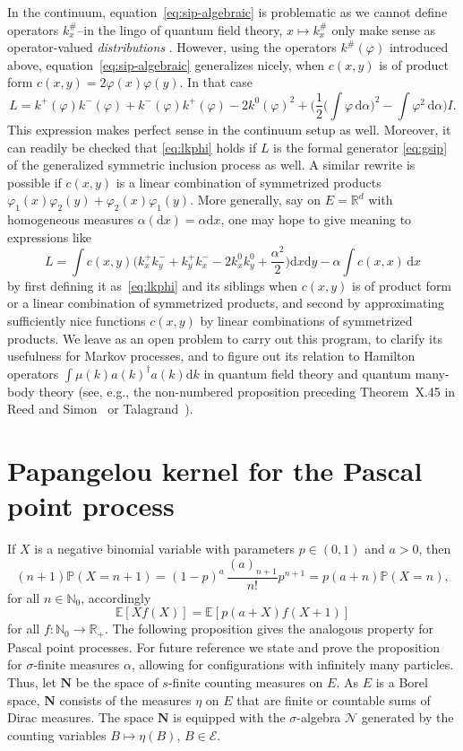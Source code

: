 \documentclass[10pt,a4paper]{amsart}
\numberwithin{equation}{section}
\newcommand{\N}{\mathbb{N}}
\newcommand{\R}{\mathbb{R}}
\renewcommand{\P}{\mathbb{P}}
\newcommand{\E}{\mathbb{E}}
\newcommand{\dd}{\mathrm{d}} %
\newcommand{\1}{\mathbbm{1}}
\begin{document}
In the continuum, equation~\eqref{eq:sip-algebraic} is problematic as we cannot define operators $k_x^\#$--in the lingo of quantum field theory, $x\mapsto k_x^\#$ only make sense as operator-valued \emph{distributions} \cite[Sec\-tion~3.7]{talagrand-book}. However, using the operators $k^\#(\varphi)$ introduced above, equation~\eqref{eq:sip-algebraic} generalizes nicely, when $c(x,y)$ is of product form $c(x,y) = 2 \varphi(x)\varphi(y)$. In that case
\begin{equation} \label{eq:lkphi}
	L = k^+(\varphi) k^-(\varphi) + k^-(\varphi)k^+(\varphi) - 2 k^0(\varphi)^2 + \biggl( \frac{1}{2} \biggl(\int \varphi \, \dd \alpha \biggr)^2 - \int \varphi^2 \, \dd \alpha \biggr) I.
\end{equation}
This expression makes perfect sense in the continuum setup as well. Moreover, it can readily be checked that \eqref{eq:lkphi} holds if $L$ is the formal generator \eqref{eq:gsip} of the generalized symmetric inclusion process as well. A similar rewrite is possible if $c(x,y)$ is a linear combination of symmetrized products $\varphi_1(x)\varphi_2(y) + \varphi_2(x)\varphi_1(y)$. More generally, say on $E=\R^d$ with homogeneous measures $\alpha(\dd x) = \alpha \dd x$, one may hope to give meaning to expressions like
\[
	L = \int c(x,y) \biggl(k_x^+k_y^- + k_y^+ k_x^- - 2 k_x^0 k_y^0 + \frac{\alpha^2}{2} \biggr) \dd x \dd y - \alpha \int c(x,x) \, \dd x
\] 	
by first defining it as~\eqref{eq:lkphi} and its siblings when $c(x,y)$ is of product form or a linear combination of symmetrized products, and second by approximating sufficiently nice functions $c(x,y)$ by linear combinations of symmetrized products. We leave as an open problem to carry out this program, to clarify its usefulness for Markov processes, and to figure out its relation to Hamilton operators $\int \mu(k) a(k)^\dagger a(k) \dd k$ in quantum field theory and quantum many-body theory (see, e.g., the non-numbered proposition preceding Theorem~X.45 in Reed and Simon~\cite{reedSimonII} or Talagrand~\mbox{\cite[Section~3.7]{talagrand-book}}).


\section{Papangelou kernel for the Pascal point process} \label{sec:pascal}


If $X$ is a negative binomial variable with parameters $p\in (0,1)$ and $a>0$, then
\[
 (n+1)\P( X = n+1) = (1-p)^a\, \frac{(a)_{n+1}}{n!} p^{n+1} = p (a+n)\P( X = n),
\]
for all $n\in \N_0$, accordingly
\[
	\E[ X f(X)] = \E[ p(a+X) f(X+1)]
\]
for all $f\colon \N_0\to \R_+$. The following proposition gives the analogous property for Pascal point processes. For future reference we state and prove the proposition for $\sigma$-finite measures $\alpha$, allowing for configurations with infinitely many particles. Thus, let $\mathbf N$ be the space of $s$-finite counting measures on $E$. As $E$ is a Borel space, $\mathbf N$ consists of the measures $\eta$ on $E$ that are finite or countable sums of Dirac measures. The space $\mathbf N$ is equipped with the $\sigma$-algebra $\mathcal N$ generated by the counting variables $B\mapsto \eta(B)$, $B\in \mathcal E$.
\end{document}
